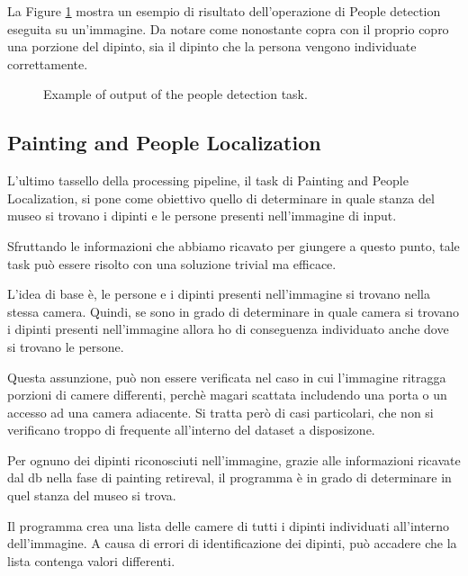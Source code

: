 \documentclass[10pt,twocolumn,letterpaper]{article}
\begin{document}
La Figure \ref{fig:peopleDetection} mostra un esempio di risultato dell'operazione di People detection eseguita su un'immagine. Da notare come nonostante copra con il proprio copro una porzione del dipinto, sia il dipinto che la persona vengono individuate correttamente.

\begin{figure}[t]
   \begin{center}
   \fbox{\rule{0pt}{2in} \rule{0.9\linewidth}{0pt}}
   \end{center}
      \caption{Example of output of the people detection task.}
   \label{fig:peopleDetection}
\end{figure}

\subsection{Painting and People Localization}

L'ultimo tassello della processing pipeline, il task di Painting and People Localization, si pone come obiettivo quello di determinare in quale stanza del museo si trovano i dipinti e le persone presenti nell'immagine di input. 

Sfruttando le informazioni che abbiamo ricavato per giungere a questo punto, tale task può essere risolto con una soluzione trivial ma efficace.

L'idea di base è, le persone e i dipinti presenti nell'immagine si trovano nella stessa camera. Quindi, se sono in grado di determinare in quale camera si trovano i dipinti presenti nell'immagine allora ho di conseguenza individuato anche dove si trovano le persone.

Questa assunzione, può non essere verificata nel caso in cui l'immagine ritragga porzioni di camere differenti, perchè magari scattata includendo una porta o un accesso ad una camera adiacente.
Si tratta però di casi particolari, che non si verificano troppo di frequente all'interno del dataset a disposizone.

Per ognuno dei dipinti riconosciuti nell'immagine, grazie alle informazioni ricavate dal db nella fase di painting retireval, il programma è in grado di determinare in quel stanza del museo si trova. 

Il programma crea una lista delle camere di tutti i dipinti individuati all'interno dell'immagine. A causa di errori di identificazione dei dipinti, può accadere che la lista contenga valori differenti.
\end{document}
